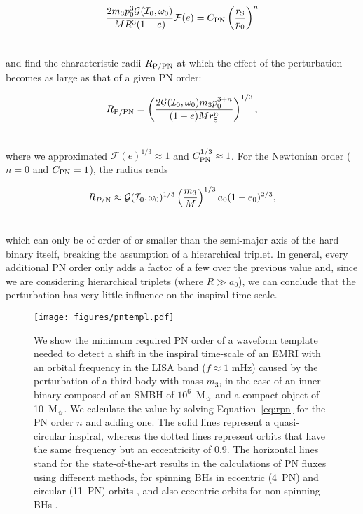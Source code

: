 \documentclass[usenatbib]{mnras}
\begin{document}
\begin{align}
    \frac{2 m_3 p_{0}^3 \mathcal{G}(\mathcal{I}_0,\omega_0)}{ M R^3 (1-e)}\mathcal{F}(e) = C_{\rm{PN}} \left( \frac{r_{\rm S}}{p_0} \right)^{n}\\ \nonumber
\end{align}

\noindent and find the characteristic radii $R_{\rm{P/PN}}$ at which the effect of the perturbation becomes as large as that of a given PN order:

\begin{align}
    R_{\rm{P/PN}} =\left( \frac{2\mathcal{G}(\mathcal{I}_0,\omega_0)m_3p_0^{3+n} }{(1-e)Mr_{\rm S}^{n}}\right)^{1/3}, \label{eq:rpn}\\ \nonumber
\end{align}

\noindent where we approximated $\mathcal{F}(e)^{1/3} \approx 1$ and $C_{\rm{PN}}^{1/3} \approx 1$. For the Newtonian order ($n=0$ and $C_{\rm{ PN}}=1$), the radius reads

\begin{align}
    R_{P/\rm N}\approx \mathcal{G}(\mathcal{I}_0,\omega_0) ^{1/3}\left(\frac{m_3}{M} \right)^{1/3}a_0(1-e_0)^{2/3},\\ \nonumber
\end{align}

\noindent which can only be of order of or smaller than the semi-major axis of the hard binary itself, breaking the assumption of a hierarchical triplet. In general, every additional PN order only adds a factor of a few over the previous value and, since we are considering hierarchical triplets (where $R \gg a_0$), we can conclude that the perturbation has very little influence on the inspiral time-scale. 

\begin{figure}
    \centering
    \texttt{[image: figures/pntempl.pdf]}
    \caption{We show the minimum required PN order of a waveform template needed to detect a shift in the inspiral time-scale of an EMRI with an orbital frequency in the LISA band ($f\approx 1 $ mHz) caused by the perturbation of a third body with mass $m_3$, in the case of an inner binary composed of an SMBH of $10^6$~M$_{\sun}$ and a compact object of 10~M$_{\sun}$. We calculate the value by solving Equation~\eqref{eq:rpn} for the PN order $n$ and adding one. The solid lines represent a quasi-circular inspiral, whereas the dotted lines represent orbits that have the same frequency but an eccentricity of 0.9. The horizontal lines stand for the state-of-the-art results in the calculations of PN fluxes using different methods, for spinning BHs in eccentric (4~PN) and circular (11~PN) orbits \citep{2015PTEP.2015c3E01F,2015PTEP.2015g3E03S}, and also eccentric orbits for non-spinning BHs \citep{2020arXiv200810622M}.}
    \label{fig:pntempl}
\end{figure}
\end{document}
